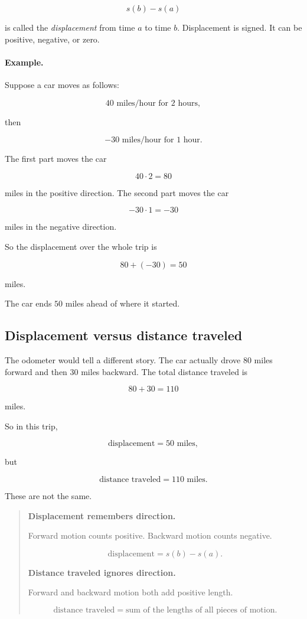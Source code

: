 \[
s(b)-s(a)
\]

is called the \emph{displacement} from time \(a\) to time \(b\). Displacement is signed. It can be positive, negative, or zero.

\paragraph{Example.}
Suppose a car moves as follows:

\[
40\text{ miles/hour for }2\text{ hours},
\]

then

\[
-30\text{ miles/hour for }1\text{ hour}.
\]

The first part moves the car

\[
40\cdot 2=80
\]

miles in the positive direction. The second part moves the car

\[
-30\cdot 1=-30
\]

miles in the negative direction.

So the displacement over the whole trip is

\[
80+(-30)=50
\]

miles.

The car ends \(50\) miles ahead of where it started.

\subsection{Displacement versus distance traveled}

The odometer would tell a different story. The car actually drove \(80\) miles forward and then \(30\) miles backward. The total distance traveled is

\[
80+30=110
\]

miles.

So in this trip,

\[
\text{displacement}=50\text{ miles},
\]

but

\[
\text{distance traveled}=110\text{ miles}.
\]

These are not the same.

\begin{quote}
\textbf{Displacement remembers direction.}

Forward motion counts positive. Backward motion counts negative.

\[
\text{displacement}=s(b)-s(a).
\]

\textbf{Distance traveled ignores direction.}

Forward and backward motion both add positive length.

\[
\text{distance traveled}=\text{sum of the lengths of all pieces of motion}.
\]
\end{quote}

